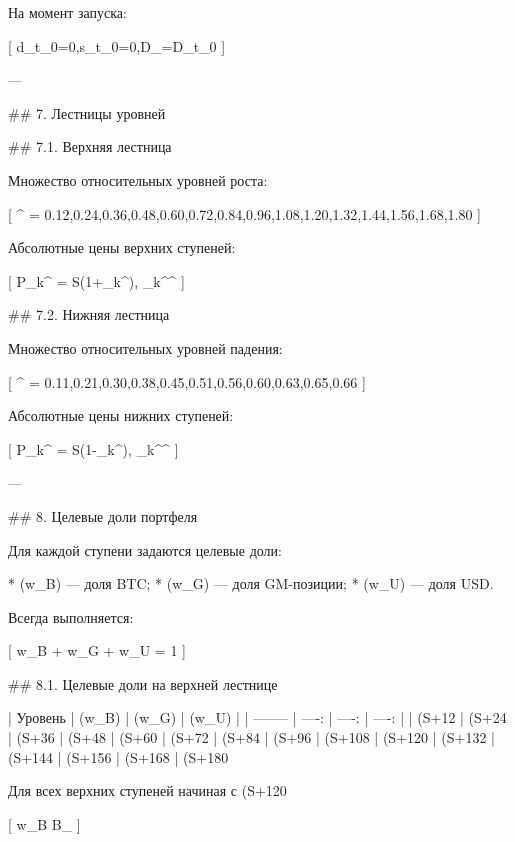 На момент запуска:

[
d_{t_0}=0,\qquad s_{t_0}=0,\qquad D_{}=D_{t_0}
]

---

## 7. Лестницы уровней

## 7.1. Верхняя лестница

Множество относительных уровней роста:

[
^{\uparrow} =
{0.12,0.24,0.36,0.48,0.60,0.72,0.84,0.96,1.08,1.20,1.32,1.44,1.56,1.68,1.80}
]

Абсолютные цены верхних ступеней:

[
P_k^{\uparrow} = S(1+\ell_k^{\uparrow}),
\qquad \ell_k^{\uparrow}\in {}^{\uparrow}
]

## 7.2. Нижняя лестница

Множество относительных уровней падения:

[
^{\downarrow} =
{0.11,0.21,0.30,0.38,0.45,0.51,0.56,0.60,0.63,0.65,0.66}
]

Абсолютные цены нижних ступеней:

[
P_k^{\downarrow} = S(1-\ell_k^{\downarrow}),
\qquad \ell_k^{\downarrow}\in {}^{\downarrow}
]

---

## 8. Целевые доли портфеля

Для каждой ступени задаются целевые доли:

* (w_B) — доля BTC;
* (w_G) — доля GM-позиции;
* (w_U) — доля USD.

Всегда выполняется:

[
w_B + w_G + w_U = 1
]

## 8.1. Целевые доли на верхней лестнице

| Уровень  | (w_B) | (w_G) | (w_U) |
| -------- | ----: | ----: | ----: |
| (S+12%
| (S+24%
| (S+36%
| (S+48%
| (S+60%
| (S+72%
| (S+84%
| (S+96%
| (S+108%
| (S+120%
| (S+132%
| (S+144%
| (S+156%
| (S+168%
| (S+180%

Для всех верхних ступеней начиная с (S+120%

[
w_B \ge B_{\min}
]

